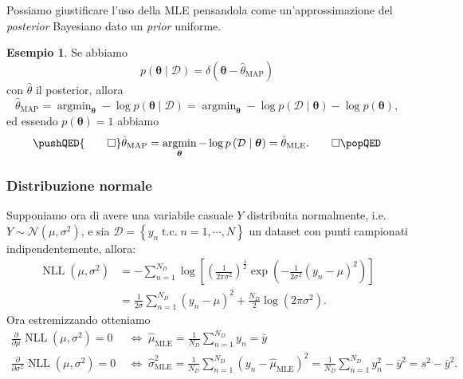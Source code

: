 \documentclass[10pt]{article}
\DeclareMathOperator*{\argmin}{argmin}
\DeclareMathOperator{\NLL}{NLL}
\renewcommand{\vec}[1]{\boldsymbol{#1}}
\newcommand{\HALF}{\frac{1}{2}}
\newcommand{\cond}{\mid}
\newcommand{\pare}[1]{
	\ensuremath{\left(#1\right)}
}
\newcommand{\spare}[1]{
	\ensuremath{\left[#1\right]}
}
\newcommand{\pderiv}[3][]{
	\ensuremath{\frac{\partial^{#1}{#2}}{\partial{#3}^{#1}}}
}
\newcommand{\tc}{\ensuremath{\;\text{t.c.}\;}}
\newcommand{\MLE}{\ensuremath{\text{MLE}}}
\theoremstyle{definition}
\newtheorem{example}{Esempio}[section]
\begin{document}
Possiamo giustificare l'uso della MLE pensandola come un'approssimazione del \textit{posterior} Bayesiano dato un \textit{prior} uniforme.

\begin{example}
Se abbiamo
\[
p\pare{\vec{\theta}\cond\mathcal{D}} = \delta\pare{\vec{\theta}- \hat{\theta}_{\text{MAP}}}
\]
con $\hat{\theta}$ il posterior, allora
\[
\hat{\theta}_{\text{MAP}} = \argmin_{\vec{\theta}}-\log p\pare{\vec{\theta}\cond\mathcal{D}} = \argmin_{\vec{\theta}} -\log p\pare{\mathcal{D}\cond\vec{\theta}} -\log p\pare{\vec{\theta}},
\]
ed essendo $p\pare{\vec{\theta}} = 1$ abbiamo
\[
\pushQED{\qed}
\hat{\theta}_{\text{MAP}} = \argmin_{\vec{\theta}} -\log p\pare{\mathcal{D}\cond\vec{\theta}} = \hat{\theta}_{\text{MLE}}.\qedhere
\popQED
\]
\end{example}

\subsubsection{Distribuzione normale}
Supponiamo ora di avere una variabile casuale $Y$ distribuita normalmente, i.e. $Y\sim \mathcal{N}\pare{\mu, \sigma^2}$, e sia $\mathcal{D} = \left\{ y_n \tc n=1,\cdots,N \right\}$ un dataset con punti campionati indipendentemente, allora:
\begin{equation}
\begin{split}
\NLL\pare{\mu, \sigma^2} &= -\sum_{n=1}^{N_D}\log\spare{\pare{\frac{1}{2\pi\sigma^2}}^\HALF \exp\pare{-\frac{1}{2\sigma^2}\pare{y_n-\mu}^2}} \\
&=\frac{1}{2\sigma}\sum_{n=1}^{N_D}\pare{y_n - \mu}^2 + \frac{N_D}{2}\log\pare{2\pi\sigma^2}.
\end{split}
\end{equation}
Ora estremizzando otteniamo
\begin{align}
\pderiv{}{\mu}\NLL\pare{\mu, \sigma^2} = 0 &\;\Longleftrightarrow\; \hat{\mu}_{\MLE} = \frac{1}{N_D}\sum_{n=1}^{N_D} y_n = \bar{y}\\
\pderiv{}{\sigma^2}\NLL\pare{\mu, \sigma^2} = 0 &\;\Longleftrightarrow\; \hat{\sigma}^2_\MLE = \frac{1}{N_D}\sum_{n=1}^{N_D}\pare{y_n - \hat{\mu}_\MLE}^2 = \frac{1}{N_D}\sum_{n=1}^{N_D}y_n^2 - \bar{y}^2 = s^2 - \bar{y}^2.
\end{align}
\end{document}
